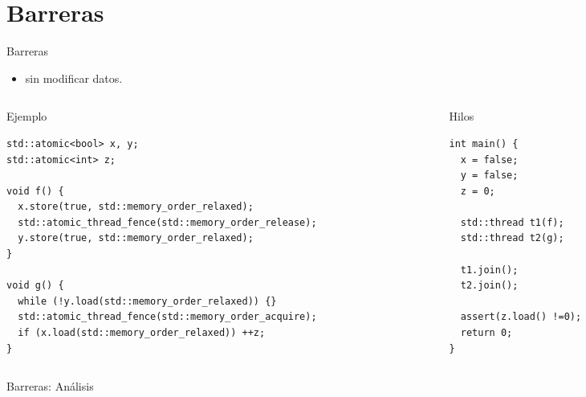 \section{Barreras}

\begin{frame}[fragile]{Barreras}
\begin{itemize}
\item {}  sin modificar datos.
\end{itemize}

\begin{columns}

\begin{column}{.7\textwidth}
\begin{block}{Ejemplo}
\begin{lstlisting}
std::atomic<bool> x, y;
std::atomic<int> z;

void f() {
  x.store(true, std::memory_order_relaxed);
  std::atomic_thread_fence(std::memory_order_release);
  y.store(true, std::memory_order_relaxed);
}

void g() {
  while (!y.load(std::memory_order_relaxed)) {}
  std::atomic_thread_fence(std::memory_order_acquire);
  if (x.load(std::memory_order_relaxed)) ++z;
}
\end{lstlisting}
\end{block}
\end{column}

\begin{column}{.3\textwidth}
\begin{block}{Hilos}
\begin{lstlisting}
int main() {
  x = false;
  y = false;
  z = 0;

  std::thread t1(f);
  std::thread t2(g);

  t1.join();
  t2.join();

  assert(z.load() !=0);
  return 0;
}
\end{lstlisting}
\end{block}
\end{column}

\end{columns}
\end{frame}

\begin{frame}{Barreras: Análisis}

\end{frame}

